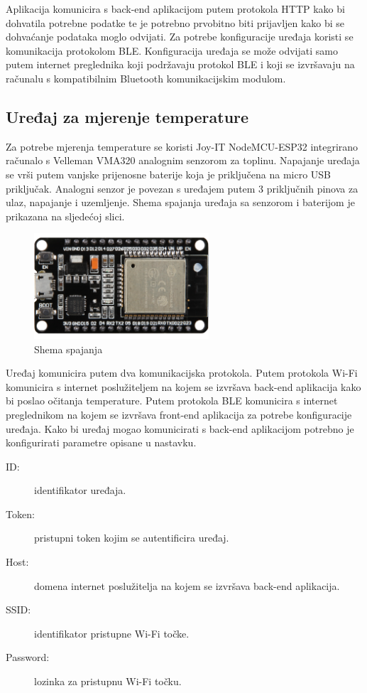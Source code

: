 \documentclass[times, utf8, diplomski]{fer}
\begin{document}
Aplikacija komunicira s back-end aplikacijom putem protokola HTTP kako bi dohvatila potrebne podatke te je potrebno prvobitno biti prijavljen kako bi se dohvaćanje podataka moglo odvijati. Za potrebe konfiguracije uređaja koristi se komunikacija protokolom BLE. Konfiguracija uređaja se može odvijati samo putem internet preglednika koji podržavaju protokol BLE i koji se izvršavaju na računalu s kompatibilnim Bluetooth komunikacijskim modulom.

\subsection{Uređaj za mjerenje temperature}
Za potrebe mjerenja temperature se koristi Joy-IT NodeMCU-ESP32 integrirano računalo s Velleman VMA320 analognim senzorom za toplinu. Napajanje uređaja se vrši putem vanjske prijenosne baterije koja je priključena na micro USB priključak. Analogni senzor je povezan s uređajem putem 3 priključnih pinova za ulaz, napajanje i uzemljenje. Shema spajanja uređaja sa senzorom i baterijom je prikazana na sljedećoj slici.
\begin{figure}[H]
    \centering
    \includegraphics[width=6.5cm, angle=90]{images/esp32.png}
    \caption{Shema spajanja}
    \label{fig:device}
\end{figure}

Uređaj komunicira putem dva komunikacijska protokola. Putem protokola Wi-Fi komunicira s internet poslužiteljem na kojem se izvršava back-end aplikacija kako bi poslao očitanja temperature. Putem protokola BLE komunicira s internet preglednikom na kojem se izvršava front-end aplikacija za potrebe konfiguracije uređaja. Kako bi uređaj mogao komunicirati s back-end aplikacijom potrebno je konfigurirati parametre opisane u nastavku.
\begin{description}
    \item[ID:] identifikator uređaja.
    \item[Token:] pristupni token kojim se autentificira uređaj.
    \item[Host:] domena internet poslužitelja na kojem se izvršava back-end aplikacija.
    \item[SSID:] identifikator pristupne Wi-Fi točke.
    \item[Password:] lozinka za pristupnu Wi-Fi točku.
\end{description}
\end{document}

